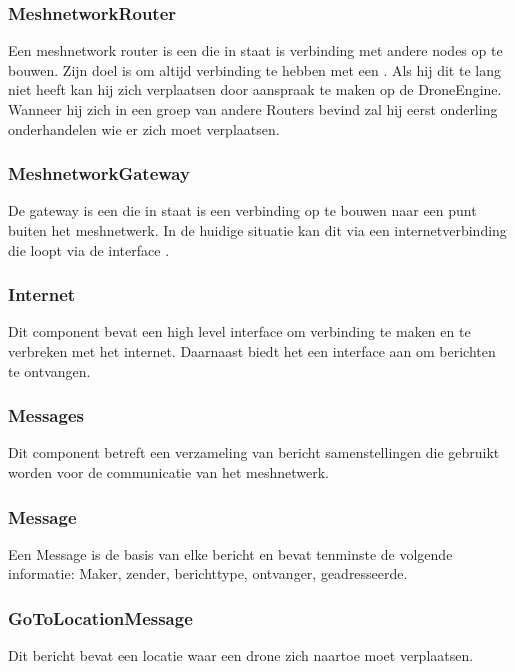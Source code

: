 \documentclass[a4paper, 11pt, oneside]{report}
\begin{document}
\subsubsection{MeshnetworkRouter}
\label{architectural:subcomponenten:MeshnetworkRouter}
Een meshnetwork router is een  die in staat is verbinding met andere nodes op te bouwen.
Zijn doel is om altijd verbinding te hebben met een .
Als hij dit te lang niet heeft kan hij zich verplaatsen door aanspraak te maken op de DroneEngine.
Wanneer hij zich in een groep van andere Routers bevind zal hij eerst onderling onderhandelen wie er zich moet verplaatsen.

\subsubsection{MeshnetworkGateway}
\label{architectural:subcomponenten:MeshnetworkGateway}
De gateway is een  die in staat is een verbinding op te bouwen naar een punt buiten het meshnetwerk. In de huidige situatie kan dit via een internetverbinding die loopt via de interface . 

\subsubsection{Internet}
\label{architectural:subcomponenten:Internet}
Dit component bevat een high level interface om verbinding te maken en te verbreken met het internet.
Daarnaast biedt het een interface aan om berichten te ontvangen.

\subsubsection{Messages}
\label{architectural:subcomponenten:Messages}
Dit component betreft een verzameling van bericht samenstellingen die gebruikt worden voor de communicatie van het meshnetwerk.

\subsubsection{Message}
\label{architectural:subcomponenten:Message}
Een Message is de basis van elke bericht en bevat tenminste de volgende informatie:  Maker, zender, berichttype, ontvanger, geadresseerde. 
\subsubsection{GoToLocationMessage}
\label{architectural:subcomponenten:GoToLocationMessage}
Dit bericht bevat een locatie waar een drone zich naartoe moet verplaatsen.
\end{document}
